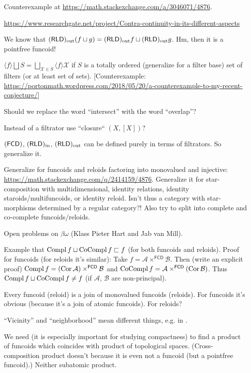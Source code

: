 \documentclass{amsart}
\begin{document}
Counterexample at \url{https://math.stackexchange.com/a/3046071/4876}.

\url{https://www.researchgate.net/project/Contra-continuity-in-its-different-aspects}

We know that $(\mathsf{RLD})_{\mathrm{out}}(f\sqcup g) = (\mathsf{RLD})_{\mathrm{out}} f\sqcup(\mathsf{RLD})_{\mathrm{out}} g$.
Hm, then it is a pointfree funcoid!

\begin{conjecture}
$\langle f \rangle \bigsqcup S = \bigsqcup_{\mathcal{X} \in S} \langle f
\rangle \mathcal{X}$ if $S$ is a totally ordered (generalize for a filter
base) set of filters (or at least set of sets).
[Counterexample: \url{https://portonmath.wordpress.com/2018/05/20/a-counterexample-to-my-recent-conjecture/}]
\end{conjecture}

Should we replace the word ``intersect'' with the word ``overlap''?

Instead of a filtrator use ``closure`` $(X,[X])$?

$(\mathsf{FCD})$, $(\mathsf{RLD})_{\mathrm{in}}$, $(\mathsf{RLD})_{\mathrm{out}}$ can be defined purely in terms of filtrators.
So generalize it.

Generalize for funcoids and reloids factoring into monovalued and injective:\\
\url{https://math.stackexchange.com/q/2414159/4876}.
Generalize it for star-composition with multidimensional, identity relations, identity staroids/multifuncoids, or identity reloid.
Isn't thus a category with star-morphisms determined by a regular category?!
Also try to split into complete and co-complete funcoids/reloids.

Open problems on $\beta\omega$ (Klass Pieter Hart and Jab van Mill).

Example that $\operatorname{Compl} f\sqcup\operatorname{CoCompl} f\sqsubset f$ (for both funcoids and reloids).
Proof for funcoids (for reloids it's similar): Take $f=\mathcal{A}\times^{\mathsf{FCD}}\mathcal{B}$. Then (write an explicit proof)
$\operatorname{Compl} f=(\operatorname{Cor}\mathcal{A})\times^{\mathsf{FCD}}\mathcal{B}$ and $\operatorname{CoCompl} f=\mathcal{A}\times^{\mathsf{FCD}}(\operatorname{Cor}\mathcal{B})$.
Thus $\operatorname{Compl} f\sqcup\operatorname{CoCompl} f\ne f$ (if $\mathcal{A}$, $\mathcal{B}$ are non-principal).

Every funcoid (reloid) is a join of monovalued funcoids (reloids). For funcoids it's obvious
(because it's a join of atomic funcoids). For reloids?

``Vicinity'' and ``neighborhood'' mean different things, e.g. in \cite{converg}.

We need (it is especially important for studying compactness) to find a product of funcoids which coincides with
product of topological spaces. (Cross-composition product doesn't because it is even not a funcoid (but a pointfree funcoid).)
Neither subatomic product.
\end{document}
